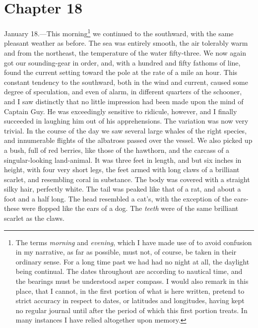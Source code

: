\section{Chapter 18}
January 18.---This morning\footnote{
The terms
\emph{morning} and \emph{evening}, which I have made use of to avoid confusion
in my narrative, as far as possible, must not, of course, be taken in their
ordinary sense. For a long time past we had had no night at all, the daylight
being continual. The dates throughout are according to nautical time, and the
bearings must be understood asper compass. I would also remark in this place,
that I cannot, in the first portion of what is here written, pretend to strict
accuracy in respect to dates, or latitudes and longitudes, having kept no
regular journal until after the period of which this first portion treats. In
many instances I have relied altogether upon memory.}
we continued to the southward, with the
same pleasant weather as before. The sea was entirely smooth, the air tolerably
warm and from the northeast, the temperature of the water fifty-three. We now
again got our sounding-gear in order, and, with a hundred and fifty fathoms of
line, found the current setting toward the pole at the rate of a mile an hour.
This constant tendency to the southward, both in the wind and current, caused
some degree of speculation, and even of alarm, in different quarters of the
schooner, and I saw distinctly that no little impression had been made upon the
mind of Captain Guy. He was exceedingly sensitive to ridicule, however, and I
finally succeeded in laughing him out of his apprehensions. The variation was
now very trivial. In the course of the day we saw several large whales of the
right species, and innumerable flights of the albatross passed over the vessel.
We also picked up a bush, full of red berries, like those of the hawthorn, and
the carcass of a singular-looking land-animal. It was three feet in length, and
but six inches in height, with four very short legs, the feet armed with long
claws of a brilliant scarlet, and resembling coral in substance. The body was
covered with a straight silky hair, perfectly white. The tail was peaked like
that of a rat, and about a foot and a half long. The head resembled a cat's,
with the exception of the ears- these were flopped like the ears of a dog. The
\emph{teeth} were of the same brilliant scarlet as the claws. 

